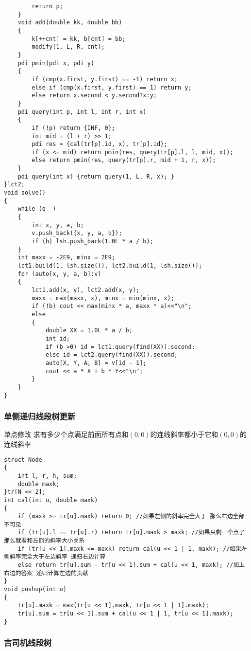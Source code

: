 \documentclass[a4paper, fontset=none]{ctexart}
\begin{document}
\begin{verbatim}
        return p;
    }
    void add(double kk, double bb)
    {
        k[++cnt] = kk, b[cnt] = bb;
        modify(1, L, R, cnt);
    }
    pdi pmin(pdi x, pdi y)
    {
        if (cmp(x.first, y.first) == -1) return x;
        else if (cmp(x.first, y.first) == 1) return y;
        else return x.second < y.second?x:y;
    }
    pdi query(int p, int l, int r, int x)
    {
        if (!p) return {INF, 0};
        int mid = (l + r) >> 1;
        pdi res = {cal(tr[p].id, x), tr[p].id};
        if (x <= mid) return pmin(res, query(tr[p].l, l, mid, x));
        else return pmin(res, query(tr[p].r, mid + 1, r, x));
    }
    pdi query(int x) {return query(1, L, R, x); }
}lct2;
void solve()
{
    while (q--)
    {
        int x, y, a, b;
        v.push_back({x, y, a, b});
        if (b) lsh.push_back(1.0L * a / b);
    }
    int maxx = -2E9, minx = 2E9;
    lct1.build(1, lsh.size()), lct2.build(1, lsh.size());
    for (auto[x, y, a, b]:v)
    {
        lct1.add(x, y), lct2.add(x, y);
        maxx = max(maxx, x), minx = min(minx, x);
        if (!b) cout << max(minx * a, maxx * a)<<"\n";
        else
        {
            double XX = 1.0L * a / b;
            int id;
            if (b >0) id = lct1.query(find(XX)).second;
            else id = lct2.query(find(XX)).second;
            auto[X, Y, A, B] = v[id - 1];
            cout << a * X + b * Y<<"\n";
        }
    }
}
\end{verbatim}
\subsubsection{单侧递归线段树更新}
单点修改 \quad 求有多少个点满足前面所有点和$(0, 0)$的连线斜率都小于它和$(0, 0)$的连线斜率

\begin{verbatim}
struct Node
{
    int l, r, h, sum;
    double maxk;
}tr[N << 2];
int cal(int u, double maxk)
{
    if (maxk >= tr[u].maxk) return 0; //如果左侧的斜率完全大于 那么右边全部不可见
    if (tr[u].l == tr[u].r) return tr[u].maxk > maxk; //如果只剩一个点了 那么就看和左侧的斜率大小关系
    if (tr[u << 1].maxk <= maxk) return cal(u << 1 | 1, maxk); //如果左侧斜率完全大于左边斜率 递归右边计算
    else return tr[u].sum - tr[u << 1].sum + cal(u << 1, maxk); //加上右边的答案 递归计算左边的贡献
}
void pushup(int u)
{
    tr[u].maxk = max(tr[u << 1].maxk, tr[u << 1 | 1].maxk);
    tr[u].sum = tr[u << 1].sum + cal(u << 1 | 1, tr[u << 1].maxk);
}
\end{verbatim}
\subsubsection{吉司机线段树}
\end{document}
